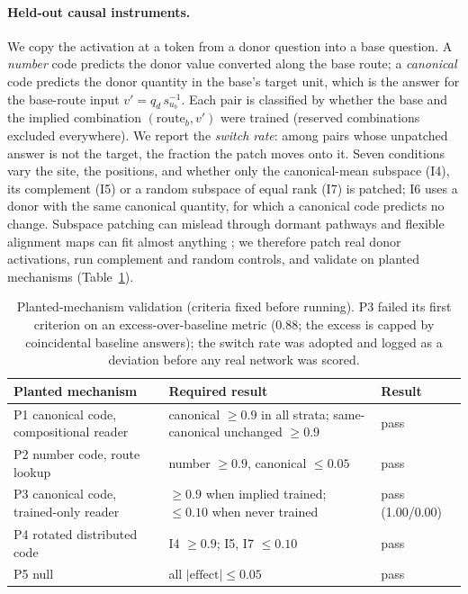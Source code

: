 \documentclass[11pt]{article}
\begin{document}
\paragraph{Held-out causal instruments.} We copy the activation at a token from a donor question into a base
question. A \emph{number} code predicts the donor value converted along the base route; a \emph{canonical} code
predicts the donor quantity in the base's target unit, which is the answer for the base-route input
$v'=q_d\,s_{u_b}^{-1}$. Each pair is classified by whether the base and the implied combination $(\text{route}_b, v')$
were trained (reserved combinations excluded everywhere). We report the \emph{switch rate}: among pairs whose
unpatched answer is not the target, the fraction the patch moves onto it. Seven conditions vary the site, the
positions, and whether only the canonical-mean subspace (I4), its complement (I5) or a random subspace of equal rank
(I7) is patched; I6 uses a donor with the same canonical quantity, for which a canonical code predicts no change.
Subspace patching can mislead through dormant pathways \citep{makelov2023illusion,wu2024reply} and flexible
alignment maps can fit almost anything \citep{sutter2025nonlinear}; we therefore patch real donor activations, run
complement and random controls, and validate on planted mechanisms (Table~\ref{tab:planted}).

\begin{table}[t]\centering\small
\caption{Planted-mechanism validation (criteria fixed before running). P3 failed its first criterion on an
excess-over-baseline metric (0.88; the excess is capped by coincidental baseline answers); the switch rate was
adopted and logged as a deviation before any real network was scored.}\label{tab:planted}
\begin{tabular}{@{}lll@{}}\toprule
Planted mechanism & Required result & Result\\\midrule
P1 canonical code, compositional reader & canonical $\ge 0.9$ in all strata; same-canonical unchanged $\ge0.9$ & pass\\
P2 number code, route lookup & number $\ge 0.9$, canonical $\le 0.05$ & pass\\
P3 canonical code, trained-only reader & $\ge0.9$ when implied trained; $\le0.10$ when never trained & pass (1.00/0.00)\\
P4 rotated distributed code & I4 $\ge0.9$; I5, I7 $\le 0.10$ & pass\\
P5 null & all $|\text{effect}|\le0.05$ & pass\\\bottomrule
\end{tabular}
\end{table}
\end{document}
